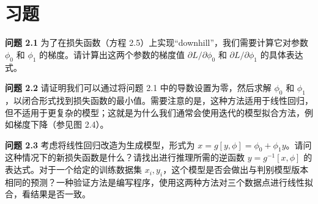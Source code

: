 \section{习题}

\textbf{问题 2.1} 为了在损失函数（方程 2.5）上实现“downhill”，我们需要计算它对参数 $\phi_0$ 和 $\phi_1$ 的梯度。请计算出这两个参数的梯度值 $\partial L / \partial \phi_0$ 和 $\partial L / \partial \phi_1$ 的具体表达式。

\textbf{问题 2.2} 请证明我们可以通过将问题 2.1 中的导数设置为零，然后求解 $\phi_0$ 和 $\phi_1$，以闭合形式找到损失函数的最小值。需要注意的是，这种方法适用于线性回归，但不适用于更复杂的模型；这就是为什么我们通常会使用迭代的模型拟合方法，例如梯度下降（参见图 2.4）。

\textbf{问题 2.3} 考虑将线性回归改造为生成模型，形式为 $x = g[y, \phi] = \phi_0 + \phi_1 y$。请问这种情况下的新损失函数是什么？请找出进行推理所需的逆函数 $y = g^{-1}[x, \phi]$ 的表达式。对于一个给定的训练数据集 {${x_i,y_i}$}，这个模型是否会做出与判别模型版本相同的预测？一种验证方法是编写程序，使用这两种方法对三个数据点进行线性拟合，看结果是否一致。